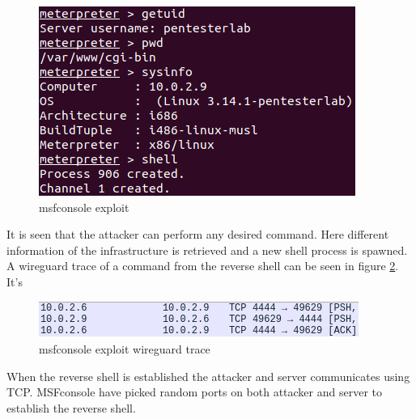 \begin{figure} [ht]
    \centering
    \includegraphics[width=\columnwidth]{../pictures/msfconsole-exploit.png}
    \caption{msfconsole exploit}
    \label{fig:msfconsole-exploit}
\end{figure}

It is seen that the attacker can perform any desired command. Here different information of the infrastructure is retrieved and a new shell process is spawned. A wireguard trace of a command from the reverse shell can be seen in figure \ref{fig:msfconsole-exploit-wireguard}. It's 

\begin{figure} [ht]
    \centering
    \includegraphics[width=\columnwidth]{../pictures/msfconsole-exploit-wireguard.png}
    \caption{msfconsole exploit wireguard trace}
    \label{fig:msfconsole-exploit-wireguard}
\end{figure}

When the reverse shell is established the attacker and server communicates using TCP. MSFconsole have picked random ports on both attacker and server to establish the reverse shell.  
